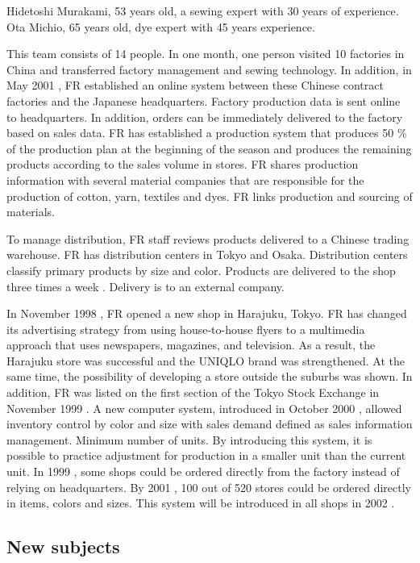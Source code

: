 \documentclass[]{article}
\begin{document}
Hidetoshi Murakami, 53 years old, a sewing expert with 30 years of
experience. Ota Michio, 65 years old, dye expert with 45 years
experience.

This team consists of 14 people. In one month, one person visited 10
factories in China and transferred factory management and sewing
technology. In addition, in May 2001 , FR established an online system
between these Chinese contract factories and the Japanese headquarters.
Factory production data is sent online to headquarters. In addition,
orders can be immediately delivered to the factory based on sales data.
FR has established a production system that produces 50 \% of the
production plan at the beginning of the season and produces the
remaining products according to the sales volume in stores. FR shares
production information with several material companies that are
responsible for the production of cotton, yarn, textiles and dyes. FR
links production and sourcing of materials.

To manage distribution, FR staff reviews products delivered to a Chinese
trading warehouse. FR has distribution centers in Tokyo and Osaka.
Distribution centers classify primary products by size and color.
Products are delivered to the shop three times a week . Delivery is to
an external company.

In November 1998 , FR opened a new shop in Harajuku, Tokyo. FR has
changed its advertising strategy from using house-to-house flyers to a
multimedia approach that uses newspapers, magazines, and television. As
a result, the Harajuku store was successful and the UNIQLO brand was
strengthened. At the same time, the possibility of developing a store
outside the suburbs was shown. In addition, FR was listed on the first
section of the Tokyo Stock Exchange in November 1999 . A new computer
system, introduced in October 2000 , allowed inventory control by color
and size with sales demand defined as sales information management.
Minimum number of units. By introducing this system, it is possible to
practice adjustment for production in a smaller unit than the current
unit. In 1999 , some shops could be ordered directly from the factory
instead of relying on headquarters. By 2001 , 100 out of 520 stores
could be ordered directly in items, colors and sizes. This system will
be introduced in all shops in 2002 .

\hypertarget{new-subjects}{%
\subsection{New subjects}\label{new-subjects}}
\end{document}
